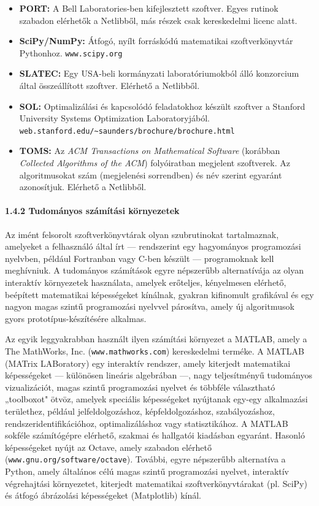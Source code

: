 \documentclass[
  magyar,
  11pt]{article}
\begin{document}
\begin{itemize}
  megjelent szoftverek. Elérhető a Netlibből.
\item
  \textbf{PORT:} A Bell Laboratories-ben kifejlesztett szoftver. Egyes
  rutinok szabadon elérhetők a Netlibből, más részek csak kereskedelmi
  licenc alatt.
\item
  \textbf{SciPy/NumPy:} Átfogó, nyílt forráskódú matematikai
  szoftverkönyvtár Pythonhoz. \texttt{www.scipy.org}
\item
  \textbf{SLATEC:} Egy USA-beli kormányzati laboratóriumokból álló
  konzorcium által összeállított szoftver. Elérhető a Netlibből.
\item
  \textbf{SOL:} Optimalizálási és kapcsolódó feladatokhoz készült
  szoftver a Stanford University Systems Optimization Laboratoryjából.
  \texttt{web.stanford.edu/\textasciitilde{}saunders/brochure/brochure.html}
\item
  \textbf{TOMS:} Az \emph{ACM Transactions on Mathematical Software}
  (korábban \emph{Collected Algorithms of the ACM}) folyóiratban
  megjelent szoftverek. Az algoritmusokat szám (megjelenési sorrendben)
  és név szerint egyaránt azonosítjuk. Elérhető a Netlibből.
\end{itemize}

\paragraph{1.4.2 Tudományos számítási
környezetek}\label{tudomuxe1nyos-szuxe1muxedtuxe1si-kuxf6rnyezetek}

Az imént felsorolt szoftverkönyvtárak olyan szubrutinokat tartalmaznak,
amelyeket a felhasználó által írt --- rendszerint egy hagyományos
programozási nyelvben, például Fortranban vagy C-ben készült ---
programoknak kell meghívniuk. A tudományos számítások egyre népszerűbb
alternatívája az olyan interaktív környezetek használata, amelyek
erőteljes, kényelmesen elérhető, beépített matematikai képességeket
kínálnak, gyakran kifinomult grafikával és egy nagyon magas szintű
programozási nyelvvel párosítva, amely új algoritmusok gyors
prototípus-készítésére alkalmas.

Az egyik leggyakrabban használt ilyen számítási környezet a MATLAB,
amely a The MathWorks, Inc. (\texttt{www.mathworks.com}) kereskedelmi
terméke. A MATLAB (MATrix LABoratory) egy interaktív rendszer, amely
kiterjedt matematikai képességeket --- különösen lineáris algebrában
---, nagy teljesítményű tudományos vizualizációt, magas szintű
programozási nyelvet és többféle választható „toolboxot" ötvöz, amelyek
speciális képességeket nyújtanak egy-egy alkalmazási területhez, például
jelfeldolgozáshoz, képfeldolgozáshoz, szabályozáshoz,
rendszeridentifikációhoz, optimalizáláshoz vagy statisztikához. A MATLAB
sokféle számítógépre elérhető, szakmai és hallgatói kiadásban egyaránt.
Hasonló képességeket nyújt az Octave, amely szabadon elérhető
(\texttt{www.gnu.org/software/octave}). További, egyre népszerűbb
alternatíva a Python, amely általános célú magas szintű programozási
nyelvet, interaktív végrehajtási környezetet, kiterjedt matematikai
szoftverkönyvtárakat (pl. SciPy) és átfogó ábrázolási képességeket
(Matplotlib) kínál.
\end{document}
